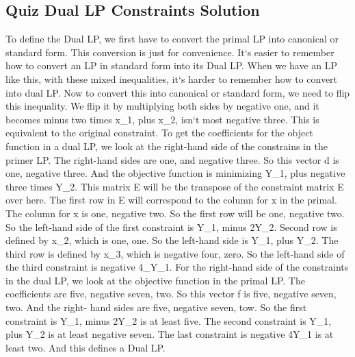 \subsection{Quiz  Dual LP Constraints Solution}
To define the Dual LP, we first have to convert the primal LP into canonical or standard form.
This conversion is just for convenience.
It`s easier to remember how to convert an LP in standard form into its Dual LP\@.
When we have an LP like this, with these mixed inequalities, it`s harder to remember how to convert into dual LP\@.
Now to convert this into canonical or standard form, we need to flip this inequality.
We flip it by multiplying both sides by negative one, and it becomes minus two times x\_1, plus x\_2, isn`t most negative three.
This is equivalent to the original constraint.
To get the coefficients for the object function in a dual LP, we look at the right-hand side of the constrains in the primer LP\@.
The right-hand sides are one, and negative three.
So this vector d is one, negative three.
And the objective function is minimizing Y\_1, plus negative three times Y\_2.
This matrix E will be the transpose of the constraint matrix E over here.
The first row in E will correspond to the column for x in the primal.
The column for x is one, negative two.
So the first row will be one, negative two.
So the left-hand side of the first constraint is Y\_1, minus 2Y\_2.
Second row is defined by x\_2, which is one, one.
So the left-hand side is Y\_1, plus Y\_2.
The third row is defined by x\_3, which is negative four, zero.
So the left-hand side of the third constraint is negative 4\_Y\_1.
For the right-hand side of the constraints in the dual LP, we look at the objective function in the primal LP\@.
The coefficients are five, negative seven, two.
So this vector f is five, negative seven, two.
And the right- hand sides are five, negative seven, tow.
So the first constraint is Y\_1, minus 2Y\_2 is at least five.
The second constraint is Y\_1, plus Y\_2 is at least negative seven.
The last constraint is negative 4Y\_1 is at least two.
And this defines a Dual LP\@.

